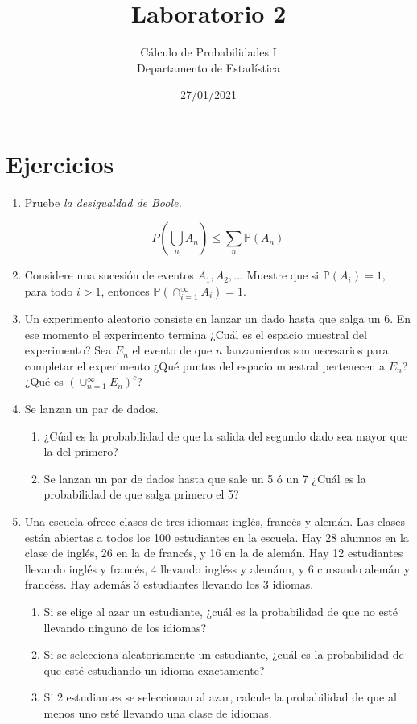 \documentclass[a4paper]{article}
\title{Laboratorio 2}
\author{Cálculo de Probabilidades I\\
        Departamento de Estadística\\
}
\date{27/01/2021}
\begin{document}
\maketitle

\section*{Ejercicios}

\begin{enumerate}
\item Pruebe \textit{la desigualdad de Boole.}

$$ P(\bigcup_n A_n) \le \sum_n \mathbb{P}(A_n)$$

\item Considere una sucesión de eventos $A_1, A_2,...$ Muestre que si $\mathbb{P}(A_i) = 1,$ para todo $i>1$, entonces $\mathbb{P}(\cap_{i = 1}^{\infty} A_i) = 1.$

\item Un experimento aleatorio consiste en lanzar un dado hasta que salga un 6. En ese momento el experimento termina ¿Cuál es el espacio muestral del experimento? Sea $E_n$ el evento de que $n$ lanzamientos son necesarios para completar el experimento ¿Qué puntos del espacio muestral pertenecen a $E_n$? ¿Qué es $(\cup_{n=1}^{\infty} E_n)^c$?

\item Se lanzan un par de dados. 
\begin{enumerate}
    \item ¿Cúal es la probabilidad de que la salida del segundo dado sea mayor que la del primero?
    \item Se lanzan un par de dados hasta que sale un 5 ó un 7 ¿Cuál es la probabilidad de que salga primero el 5?
\end{enumerate}

\item Una escuela ofrece clases de tres idiomas: inglés, francés y alemán. Las clases están abiertas a todos los 100 estudiantes en la escuela. Hay 28 alumnos en la clase de inglés, 26 en la de francés, y 16 en la de alemán. Hay 12 estudiantes llevando inglés y francés, 4 llevando ingléss y alemánn, y 6 cursando alemán y francéss. Hay además 3 estudiantes llevando los 3 idiomas.
\begin{enumerate}
    \item Si se elige al azar un estudiante, ¿cuál es la probabilidad de que no esté llevando ninguno de los idiomas?
    \item Si se selecciona aleatoriamente un estudiante, ¿cuál es la probabilidad de que esté estudiando un idioma exactamente?
    \item Si 2 estudiantes se seleccionan al azar, calcule la probabilidad de que al menos uno esté llevando una clase de idiomas.
\end{enumerate}


\end{enumerate}
\end{document}
